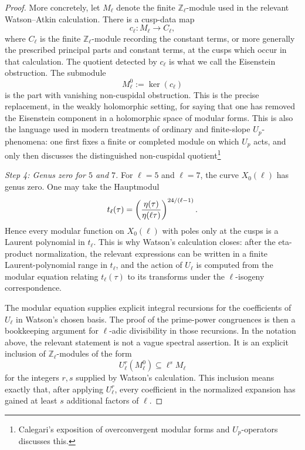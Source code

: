 \documentclass[12pt]{amsart}
\theoremstyle{definition}
\theoremstyle{remark}
\begin{document}
\begin{proof}
More concretely, let \(M_\ell\) denote the finite
\(\mathbb Z_\ell\)-module used in the relevant Watson--Atkin calculation.
There is a cusp-data map
\[
        c_\ell:M_\ell\longrightarrow C_\ell,
\]
where \(C_\ell\) is the finite \(\mathbb Z_\ell\)-module recording the
constant terms, or more generally the prescribed principal parts and
constant terms, at the cusps which occur in that calculation.  The
quotient detected by \(c_\ell\) is what we call the Eisenstein
obstruction.  The submodule
\[
        M_\ell^0:=\ker(c_\ell)
\]
is the part with vanishing non-cuspidal obstruction.  This is the
precise replacement, in the weakly holomorphic setting, for saying that
one has removed the Eisenstein component in a holomorphic space of
modular forms.  This is also the language used in modern treatments of
ordinary and finite-slope \(U_p\)-phenomena: one first fixes a finite or
completed module on which \(U_p\) acts, and only then discusses the
distinguished non-cuspidal quotient\footnote{Calegari's
exposition of overconvergent modular forms and \(U_p\)-operators
\cite{Calegari} discusses this.}

\smallskip
\noindent
\emph{Step 4: Genus zero for \(5\) and \(7\).}
For \(\ell=5\) and \(\ell=7\), the curve \(X_0(\ell)\) has genus zero.
One may take the Hauptmodul
\[
        t_\ell(\tau)
        =
        \left({\eta(\tau)\over \eta(\ell\tau)}\right)^{24/(\ell-1)}.
\]
Hence every modular function on \(X_0(\ell)\) with poles only at the
cusps is a Laurent polynomial in \(t_\ell\).  This is why Watson's
calculation closes: after the eta-product normalization, the relevant
expressions can be written in a finite Laurent-polynomial range in
\(t_\ell\), and the action of \(U_\ell\) is computed from the modular
equation relating \(t_\ell(\tau)\) to its transforms under the
\(\ell\)-isogeny correspondence.

The modular equation supplies explicit integral recursions for the
coefficients of \(U_\ell\) in Watson's chosen basis.  The proof of the
prime-power congruences is then a bookkeeping argument for
\(\ell\)-adic divisibility in those recursions.  In the notation above,
the relevant statement is not a vague spectral assertion.  It is an
explicit inclusion of \(\mathbb Z_\ell\)-modules of the form
\[
        U_\ell^r(M_\ell^0)\subseteq \ell^s M_\ell
\]
for the integers \(r,s\) supplied by Watson's calculation.  This
inclusion means exactly that, after applying \(U_\ell^r\), every
coefficient in the normalized expansion has gained at least \(s\)
additional factors of \(\ell\).


\end{proof}
\end{document}
